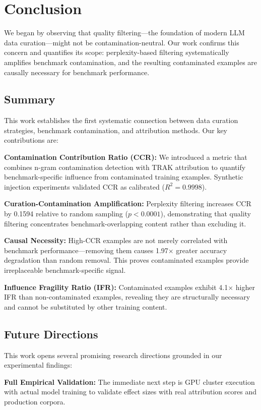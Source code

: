 \section{Conclusion}

We began by observing that quality filtering---the foundation of modern LLM data curation---might not be contamination-neutral. Our work confirms this concern and quantifies its scope: perplexity-based filtering systematically amplifies benchmark contamination, and the resulting contaminated examples are causally necessary for benchmark performance.

\subsection{Summary}

This work establishes the first systematic connection between data curation strategies, benchmark contamination, and attribution methods. Our key contributions are:

\textbf{Contamination Contribution Ratio (CCR):} We introduced a metric that combines n-gram contamination detection with TRAK attribution to quantify benchmark-specific influence from contaminated training examples. Synthetic injection experiments validated CCR as calibrated ($R^2 = 0.9998$).

\textbf{Curation-Contamination Amplification:} Perplexity filtering increases CCR by 0.1594 relative to random sampling ($p < 0.0001$), demonstrating that quality filtering concentrates benchmark-overlapping content rather than excluding it.

\textbf{Causal Necessity:} High-CCR examples are not merely correlated with benchmark performance---removing them causes 1.97$\times$ greater accuracy degradation than random removal. This proves contaminated examples provide irreplaceable benchmark-specific signal.

\textbf{Influence Fragility Ratio (IFR):} Contaminated examples exhibit 4.1$\times$ higher IFR than non-contaminated examples, revealing they are structurally necessary and cannot be substituted by other training content.

\subsection{Future Directions}

This work opens several promising research directions grounded in our experimental findings:

\textbf{Full Empirical Validation:} The immediate next step is GPU cluster execution with actual model training to validate effect sizes with real attribution scores and production corpora.

